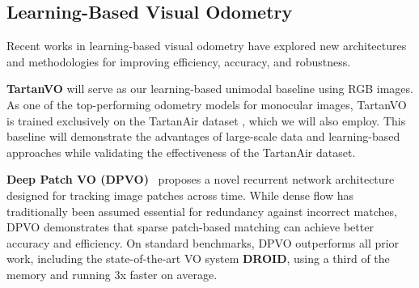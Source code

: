 \documentclass[11pt,a4paper]{article}
\begin{document}




\subsection{Learning-Based Visual Odometry}
Recent works in learning-based visual odometry have explored new architectures and methodologies for improving efficiency, accuracy, and robustness.

\textbf{TartanVO} \cite{tartanvo} will serve as our learning-based unimodal baseline using RGB images. As one of the top-performing odometry models for monocular images, TartanVO is trained exclusively on the TartanAir dataset \cite{tartanair}, which we will also employ. This baseline will demonstrate the advantages of large-scale data and learning-based approaches while validating the effectiveness of the TartanAir dataset.


\textbf{Deep Patch VO (DPVO)}~\cite{deepVO} proposes a novel recurrent network architecture designed for tracking image patches across time. While dense flow has traditionally been assumed essential for redundancy against incorrect matches, DPVO demonstrates that sparse patch-based matching can achieve better accuracy and efficiency. On standard benchmarks, DPVO outperforms all prior work, including the state-of-the-art VO system \textbf{DROID}, using a third of the memory and running 3x faster on average.
\end{document}
